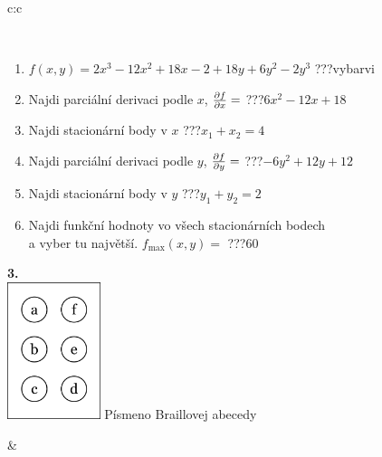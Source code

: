 \documentclass[10pt]{report}
\begin{document}
\begin{tabular}{c:c}
\begin{minipage}[c][104.5mm][t]{0.5\linewidth}
\begin{center}
\begin{minipage}{0.95\linewidth}
\begin{center}
\end{center}
\end{minipage}
\\[1mm]
\begin{minipage}{0.79\linewidth}
\begin{center}
\begin{varwidth}{\linewidth}
\begin{enumerate}
\normalsize
\item $f(x,y)=2x^3-12x^2+18x-2+18y+6y^2-2y^3$\quad \dotfill\; ???\;\dotfill \quad vybarvi
\item Najdi parciální derivaci podle $x$, $\pdv{f}{x}=$\quad \dotfill\; ???\;\dotfill \quad $6x^2-12x+18$
\item Najdi stacionární body v $x$\quad \dotfill\; ???\;\dotfill \quad $x_1+x_2=4$
\item Najdi parciální derivaci podle $y$, $\pdv{f}{y}=$\quad \dotfill\; ???\;\dotfill \quad $-6y^2+12y+12$
\item Najdi stacionární body v $y$\quad \dotfill\; ???\;\dotfill \quad $y_1+y_2=2$
\item Najdi funkční hodnoty vo všech stacionárních bodech \\ \phantom{xxxxxx} a vyber tu najvětší. $f_{\text{max}}(x,y)=$\quad \dotfill\; ???\;\dotfill \quad $60$
\end{enumerate}
\end{varwidth}
\end{center}
\end{minipage}
\begin{minipage}{0.20\linewidth}
\begin{center}
{\Huge\bfseries 3.} \\[2mm]
\includegraphics[height=40mm]{../images/braille.png}
{\small Písmeno Braillovej abecedy}
\end{center}
\end{minipage}
\end{center}
\end{minipage}
&
\begin{minipage}[c][104.5mm][t]{0.5\linewidth}
\begin{center}

\end{center}
\end{minipage}
\end{tabular}
\end{document}
